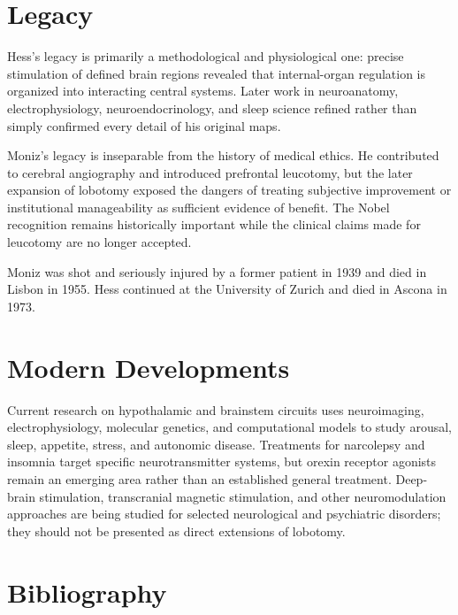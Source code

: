 \section{Legacy}

Hess's legacy is primarily a methodological and physiological one: precise stimulation of defined brain regions revealed that internal-organ regulation is organized into interacting central systems. Later work in neuroanatomy, electrophysiology, neuroendocrinology, and sleep science refined rather than simply confirmed every detail of his original maps.

Moniz's legacy is inseparable from the history of medical ethics. He contributed to cerebral angiography and introduced prefrontal leucotomy, but the later expansion of lobotomy exposed the dangers of treating subjective improvement or institutional manageability as sufficient evidence of benefit. The Nobel recognition remains historically important while the clinical claims made for leucotomy are no longer accepted.

Moniz was shot and seriously injured by a former patient in 1939 and died in Lisbon in 1955. Hess continued at the University of Zurich and died in Ascona in 1973.

\section{Modern Developments}

Current research on hypothalamic and brainstem circuits uses neuroimaging, electrophysiology, molecular genetics, and computational models to study arousal, sleep, appetite, stress, and autonomic disease. Treatments for narcolepsy and insomnia target specific neurotransmitter systems, but orexin receptor agonists remain an emerging area rather than an established general treatment. Deep-brain stimulation, transcranial magnetic stimulation, and other neuromodulation approaches are being studied for selected neurological and psychiatric disorders; they should not be presented as direct extensions of lobotomy.

\section{Bibliography}


